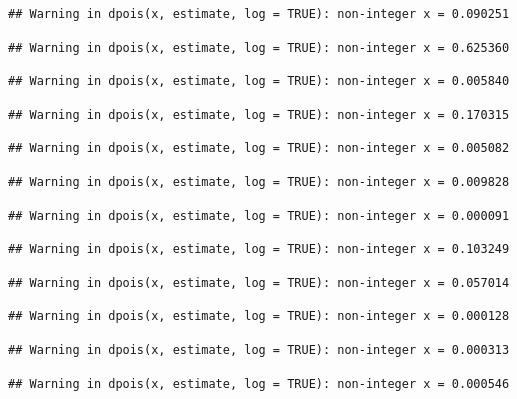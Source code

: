 \documentclass[]{article}
\begin{document}
\begin{verbatim}
## Warning in dpois(x, estimate, log = TRUE): non-integer x = 0.090251
\end{verbatim}

\begin{verbatim}
## Warning in dpois(x, estimate, log = TRUE): non-integer x = 0.625360
\end{verbatim}

\begin{verbatim}
## Warning in dpois(x, estimate, log = TRUE): non-integer x = 0.005840
\end{verbatim}

\begin{verbatim}
## Warning in dpois(x, estimate, log = TRUE): non-integer x = 0.170315
\end{verbatim}

\begin{verbatim}
## Warning in dpois(x, estimate, log = TRUE): non-integer x = 0.005082
\end{verbatim}

\begin{verbatim}
## Warning in dpois(x, estimate, log = TRUE): non-integer x = 0.009828
\end{verbatim}

\begin{verbatim}
## Warning in dpois(x, estimate, log = TRUE): non-integer x = 0.000091
\end{verbatim}

\begin{verbatim}
## Warning in dpois(x, estimate, log = TRUE): non-integer x = 0.103249
\end{verbatim}

\begin{verbatim}
## Warning in dpois(x, estimate, log = TRUE): non-integer x = 0.057014
\end{verbatim}

\begin{verbatim}
## Warning in dpois(x, estimate, log = TRUE): non-integer x = 0.000128
\end{verbatim}

\begin{verbatim}
## Warning in dpois(x, estimate, log = TRUE): non-integer x = 0.000313
\end{verbatim}

\begin{verbatim}
## Warning in dpois(x, estimate, log = TRUE): non-integer x = 0.000546
\end{verbatim}
\end{document}
